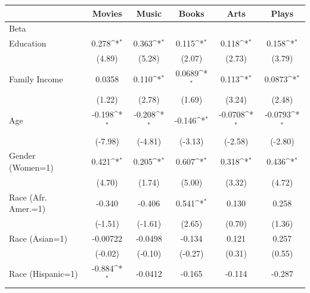 {
\def\sym#1{\ifmmode^{#1}\else\(^{#1}\)\fi}
\begin{longtable}{l*{5}{c}}
\toprule\endfirsthead\midrule\endhead\midrule\endfoot\endlastfoot
                    &\multicolumn{1}{c}{Movies}&\multicolumn{1}{c}{Music}&\multicolumn{1}{c}{Books}&\multicolumn{1}{c}{Arts}&\multicolumn{1}{c}{Plays}\\
\midrule
Beta                &                   &                   &                   &                   &                   \\
Education           &       0.278\sym{*}&       0.363\sym{*}&       0.115\sym{*}&       0.118\sym{*}&       0.158\sym{*}\\
                    &      (4.89)       &      (5.28)       &      (2.07)       &      (2.73)       &      (3.79)       \\
Family Income       &      0.0358       &       0.110\sym{*}&      0.0689\sym{*}&       0.113\sym{*}&      0.0873\sym{*}\\
                    &      (1.22)       &      (2.78)       &      (1.69)       &      (3.24)       &      (2.48)       \\
Age                 &      -0.198\sym{*}&      -0.208\sym{*}&      -0.146\sym{*}&     -0.0708\sym{*}&     -0.0793\sym{*}\\
                    &     (-7.98)       &     (-4.81)       &     (-3.13)       &     (-2.58)       &     (-2.80)       \\
Gender (Women=1)    &       0.421\sym{*}&       0.205\sym{*}&       0.607\sym{*}&       0.318\sym{*}&       0.436\sym{*}\\
                    &      (4.70)       &      (1.74)       &      (5.00)       &      (3.32)       &      (4.72)       \\
Race (Afr. Amer.=1) &      -0.340       &      -0.406       &       0.541\sym{*}&       0.130       &       0.258       \\
                    &     (-1.51)       &     (-1.61)       &      (2.65)       &      (0.70)       &      (1.36)       \\
Race (Asian=1)      &    -0.00722       &     -0.0498       &      -0.134       &       0.121       &       0.257       \\
                    &     (-0.02)       &     (-0.10)       &     (-0.27)       &      (0.31)       &      (0.55)       \\
Race (Hispanic=1)   &      -0.884\sym{*}&     -0.0412       &      -0.165       &      -0.114       &      -0.287       \\

\end{longtable}}

